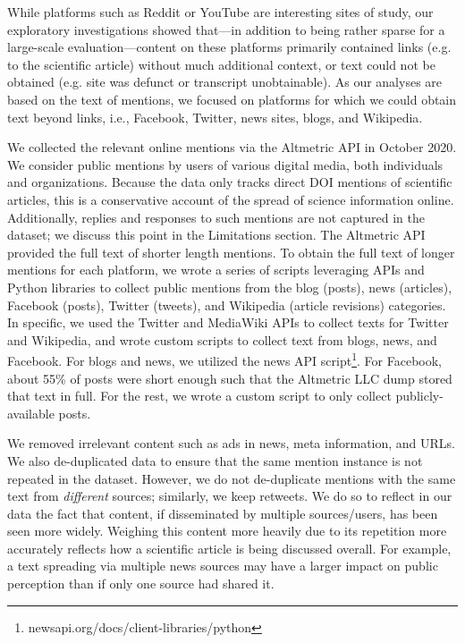 \documentclass[letterpaper]{article} %
\begin{document}
While platforms such as Reddit or YouTube are interesting sites of study, our exploratory investigations showed that---in addition to being rather sparse for a large-scale evaluation---content on these platforms primarily contained links (e.g. to the scientific article) without much additional context, or text could not be obtained (e.g. site was defunct or transcript unobtainable). As our analyses are based on the text of mentions, we focused on platforms for which we could obtain text beyond links, i.e., Facebook, Twitter, news sites, blogs, and Wikipedia.

We collected the relevant online mentions via the Altmetric API in October 2020. We consider public mentions by users of various digital media, both individuals and organizations. Because the data only tracks direct DOI mentions of scientific articles, this is a conservative account of the spread of science information online. Additionally, replies and responses to such mentions are not captured in the dataset; we discuss this point in the Limitations section.
The Altmetric API provided the full text of shorter length mentions. To obtain the full text of longer mentions for each platform, we wrote a series of scripts leveraging APIs and Python libraries to collect public mentions from the blog (posts), news (articles), Facebook (posts), Twitter (tweets), and Wikipedia (article revisions) categories. %
In specific, we used the Twitter and MediaWiki APIs to collect texts for Twitter and Wikipedia, and wrote custom scripts to collect text from blogs, news, and Facebook. For blogs and news, we utilized the news API script\footnote{newsapi.org/docs/client-libraries/python}. For Facebook, about 55\% of posts were short enough such that the Altmetric LLC dump stored that text in full. For the rest, we wrote a custom script to only collect publicly-available posts. 

We removed irrelevant content such as ads in news, meta information, and URLs. We also de-duplicated data to ensure that the same mention instance is not repeated in the dataset. However, we do not de-duplicate mentions with the same text from \textit{different} sources; similarly, we keep retweets. We do so to reflect in our data the fact that content, if disseminated by multiple sources/users, has been seen more widely. Weighing this content more heavily due to its repetition more accurately reflects how a scientific article is being discussed overall. For example, a text spreading via multiple news sources may have a larger impact on public perception than if only one source had shared it.
\end{document}

